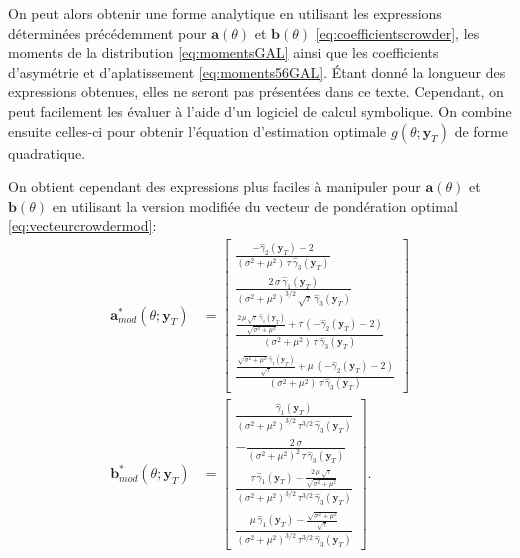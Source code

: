 On peut alors obtenir une forme analytique en utilisant les
expressions déterminées précédemment pour $\mathbf{a}(\theta)$ et
$\mathbf{b}(\theta)$ \eqref{eq:coefficientscrowder}, les moments de la
distribution \eqref{eq:momentsGAL} ainsi que les coefficients
d'asymétrie et d'aplatissement \eqref{eq:moments56GAL}. Étant donné la
longueur des expressions obtenues, elles ne seront pas présentées dans
ce texte. Cependant, on peut facilement les évaluer à l'aide d'un
logiciel de calcul symbolique. On combine ensuite celles-ci pour
obtenir l'équation d'estimation optimale $g\left(\theta;\mathbf{y}_T
\right)$ de forme quadratique.

On obtient cependant des expressions plus faciles à manipuler pour
$\mathbf{a}(\theta)$ et $\mathbf{b}(\theta)$ en utilisant la version
modifiée du vecteur de pondération optimal
\eqref{eq:vecteurcrowdermod}:
\begin{subequations}
  \label{eq:vecteurcrowdermodGAL}
  \begin{align}
    \mathbf{a}_{mod}^{*}(\theta;\mathbf{y}_T) &= \begin{bmatrix}
      \frac{-\hat\gamma_2\left(\mathbf{y}_T\right)-2}{\left( {\sigma}^{2}+{\mu}^{2}\right) \,\tau\,\hat\gamma_3\left(\mathbf{y}_T\right) } \\
      \frac{2\,\sigma\,\hat\gamma_1\left(\mathbf{y}_T\right)}{{\left( {\sigma}^{2}+{\mu}^{2}\right) }^{3/2}\,\sqrt{\tau}\,\hat\gamma_3\left(\mathbf{y}_T\right) } \\
      \frac{\frac{2\,\mu\,\sqrt{\tau}\,\hat\gamma_1\left(\mathbf{y}_T\right)}{\sqrt{{\sigma}^{2}+{\mu}^{2}}}+\tau\,\left( -\hat\gamma_2\left(\mathbf{y}_T\right)-2\right) }{\left( {\sigma}^{2}+{\mu}^{2}\right) \,\tau\,\hat\gamma_3\left(\mathbf{y}_T\right) } \\
      \frac{\frac{\sqrt{{\sigma}^{2}+{\mu}^{2}}\,\hat\gamma_1\left(\mathbf{y}_T\right)}{\sqrt{\tau}}+\mu\,\left(
          -\hat\gamma_2\left(\mathbf{y}_T\right)-2\right) }{\left(
          {\sigma}^{2}+{\mu}^{2}\right)
        \,\tau\,\hat\gamma_3\left(\mathbf{y}_T\right) }
    \end{bmatrix} \\
    \mathbf{b}_{mod}^{*}(\theta;\mathbf{y}_T) &= \begin{bmatrix}
      \frac{\hat\gamma_1\left(\mathbf{y}_T\right)}{{\left( {\sigma}^{2}+{\mu}^{2}\right) }^{3/2}\,{\tau}^{3/2}\,\hat\gamma_3\left(\mathbf{y}_T\right) } \\
      -\frac{2\,\sigma}{{\left( {\sigma}^{2}+{\mu}^{2}\right) }^{2}\,\tau\,\hat\gamma_3\left(\mathbf{y}_T\right) } \\
      \frac{\tau\,\hat\gamma_1\left(\mathbf{y}_T\right)-\frac{2\,\mu\,\sqrt{\tau}}{\sqrt{{\sigma}^{2}+{\mu}^{2}}}}{{\left( {\sigma}^{2}+{\mu}^{2}\right) }^{3/2}\,{\tau}^{3/2}\,\hat\gamma_3\left(\mathbf{y}_T\right) } \\
      \frac{\mu\,\hat\gamma_1\left(\mathbf{y}_T\right)-\frac{\sqrt{{\sigma}^{2}+{\mu}^{2}}}{\sqrt{\tau}}}{{\left(
            {\sigma}^{2}+{\mu}^{2}\right)
        }^{3/2}\,{\tau}^{3/2}\,\hat\gamma_3\left(\mathbf{y}_T\right) }
    \end{bmatrix}.
  \end{align}
\end{subequations}

